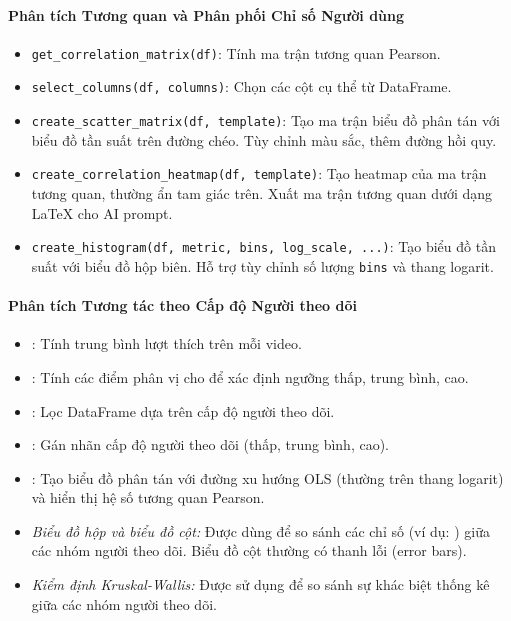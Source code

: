 \paragraph{Phân tích Tương quan và Phân phối Chỉ số Người dùng}
\begin{itemize}
    \item \texttt{get\_correlation\_matrix(df)}: Tính ma trận tương quan Pearson.

    \item \texttt{select\_columns(df, columns)}: Chọn các cột cụ thể từ DataFrame.
    
    \item \texttt{create\_scatter\_matrix(df, template)}: Tạo ma trận biểu đồ phân tán với biểu đồ tần suất trên đường chéo. Tùy chỉnh màu sắc, thêm đường hồi quy.
    
    \item \texttt{create\_correlation\_heatmap(df, template)}: Tạo heatmap của ma trận tương quan, thường ẩn tam giác trên. Xuất ma trận tương quan dưới dạng LaTeX cho AI prompt.
    
    \item \texttt{create\_histogram(df, metric, bins, log\_scale, ...)}: Tạo biểu đồ tần suất với biểu đồ hộp biên. Hỗ trợ tùy chỉnh số lượng \texttt{bins} và thang logarit.
\end{itemize}


\paragraph{Phân tích Tương tác theo Cấp độ Người theo dõi}
\begin{itemize}
    \item {}: Tính trung bình lượt thích trên mỗi video.

    \item {}: Tính các điểm phân vị cho  để xác định ngưỡng thấp, trung bình, cao.
    
    \item {}: Lọc DataFrame dựa trên cấp độ người theo dõi.
    
    \item {}: Gán nhãn cấp độ người theo dõi (thấp, trung bình, cao).
    
    \item {}: Tạo biểu đồ phân tán với đường xu hướng OLS (thường trên thang logarit) và hiển thị hệ số tương quan Pearson.
    
    \item \textit{Biểu đồ hộp và biểu đồ cột:} Được dùng để so sánh các chỉ số (ví dụ: ) giữa các nhóm người theo dõi. Biểu đồ cột thường có thanh lỗi (error bars).
    
    \item \textit{Kiểm định Kruskal-Wallis:} Được sử dụng để so sánh sự khác biệt thống kê giữa các nhóm người theo dõi.
\end{itemize}

